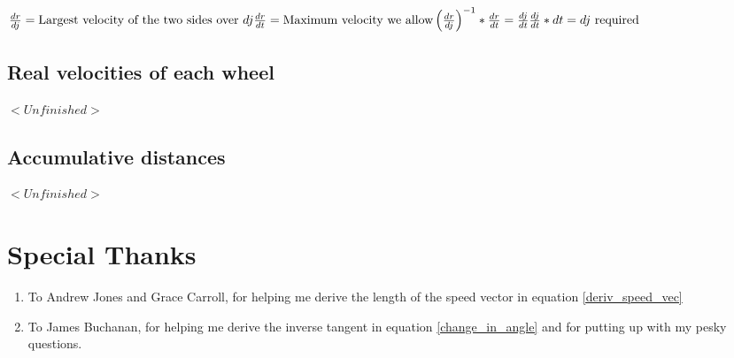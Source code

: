 \documentclass[12pt, english]{article}
\begin{document}
\noindent
\begin{math}
	\frac{dr}{dj} = 
	\text{Largest velocity of the two sides over } dj\\
	\\
	\frac{dr}{dt} = \text{Maximum velocity we allow} \\
	\\
	\left(\frac{dr}{dj}\right)^{-1} * \frac{dr}{dt} = \frac{dj}{dt} \\
	\\
	\frac{dj}{dt} * dt = dj \text{ required}
\end{math}

\subsection{Real velocities of each wheel}
$<Unfinished>$
\subsection{Accumulative distances}
$<Unfinished>$

\section{Special Thanks}
\begin{enumerate}
	\item To Andrew Jones and Grace Carroll, for helping me derive the length of the speed vector in equation \ref{deriv_speed_vec}
	\item To James Buchanan, for helping me derive the inverse tangent in equation \ref{change_in_angle} and for putting up with my pesky questions.
\end{enumerate}
\end{document}
